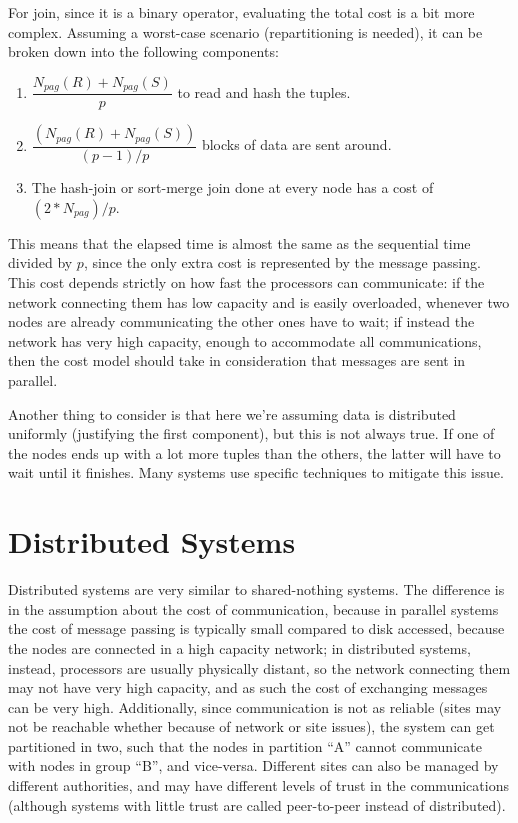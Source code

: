 For join, since it is a binary operator, evaluating the total cost is a bit more complex. Assuming a worst-case scenario (repartitioning is needed), it can be broken down into the following components:
\begin{enumerate}
    \item $\dfrac{N_{pag}(R) + N_{pag}(S)}{p}$ to read and hash the tuples.

    \item $\dfrac{(N_{pag}(R) + N_{pag}(S))}{(p-1)/p}$ blocks of data are sent around.

    \item The hash-join or sort-merge join done at every node has a cost of $(2*N_{pag})/p$.
\end{enumerate}
This means that the elapsed time is almost the same as the sequential time divided by $p$, since the only extra cost is represented by the message passing. This cost depends strictly on how fast the processors can communicate: if the network connecting them has low capacity and is easily overloaded, whenever two nodes are already communicating the other ones have to wait; if instead the network has very high capacity, enough to accommodate all communications, then the cost model should take in consideration that messages are sent in parallel.

Another thing to consider is that here we're assuming data is distributed uniformly (justifying the first component), but this is not always true. If one of the nodes ends up with a lot more tuples than the others, the latter will have to wait until it finishes. Many systems use specific techniques to mitigate this issue.

\section{Distributed Systems}

Distributed systems are very similar to shared-nothing systems. The difference is in the assumption about the cost of communication, because in parallel systems the cost of message passing is typically small compared to disk accessed, because the nodes are connected in a high capacity network; in distributed systems, instead, processors are usually physically distant, so the network connecting them may not have very high capacity, and as such the cost of exchanging messages can be very high. Additionally, since communication is not as reliable (sites may not be reachable whether because of network or site issues), the system can get partitioned in two, such that the nodes in partition ``A'' cannot communicate with nodes in group ``B'', and vice-versa. Different sites can also be managed by different authorities, and may have different levels of trust in the communications (although systems with little trust are called peer-to-peer instead of distributed).


